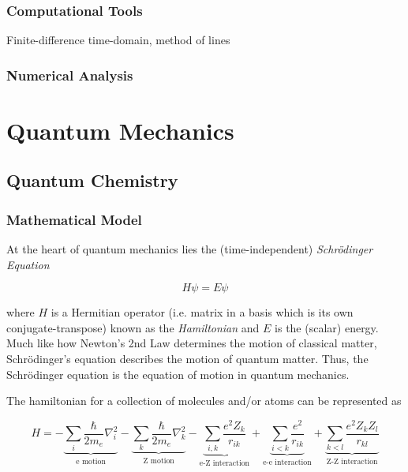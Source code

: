 \documentclass{report}
\begin{document}
        \subsection{Computational Tools}

            Finite-difference time-domain, method of lines

        \subsection{Numerical Analysis}

\chapter{Quantum Mechanics} \label{sec:quantum}

    \section{Quantum Chemistry}

        \subsection{Mathematical Model}

            At the heart of quantum mechanics lies the (time-independent) \emph{Schr{\"o}dinger Equation}

            \begin{equation}
                H \psi = E \psi
            \end{equation}

            where $H$ is a Hermitian operator (i.e. matrix in a basis which is its own conjugate-transpose) known as the \emph{Hamiltonian} and $E$ is the (scalar) energy.  Much like how Newton's 2nd Law determines the motion of classical matter, Schr{\"o}dinger's equation describes the motion of quantum matter.  Thus, the Schr{\"o}dinger equation is the equation of motion in quantum mechanics.
            
            The hamiltonian for a collection of molecules and/or atoms can be represented as\cite{cramer2013essentials}

            \begin{equation}
                H = -\underbrace{\sum_i \frac{\hbar}{2 m_e} \nabla_i^2}_{\text{e motion}} - \underbrace{\sum_k \frac{\hbar}{2 m_e} \nabla_k^2}_{\text{Z motion}} - \underbrace{\sum_{i,k} \frac{e^2 Z_k}{r_{ik}}}_{\text{e-Z interaction}} + \underbrace{\sum_{i < k} \frac{e^2}{r_{ik}}}_{\text{e-e interaction}} + \underbrace{\sum_{k < l} \frac{e^2 Z_k Z_l}{r_{kl}}}_{\text{Z-Z interaction}}
            \end{equation}
\end{document}
